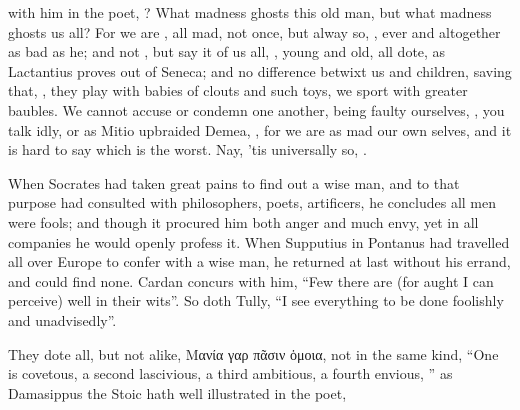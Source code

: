 with him in the poet, ? What madness ghosts this old man, but what madness
ghosts us all? For we are , all mad,  not once, but alway so, , ever and
altogether as bad as he; and not , but say it
of us all, , young and old, all dote, as Lactantius proves out
of Seneca; and no difference betwixt us and children, saving that, , they play with babies of clouts and such toys,
we sport with greater baubles. We cannot accuse or condemn one another, being
faulty ourselves, , you talk idly, or as
Mitio upbraided Demea, , for we are as
mad our own selves, and it is hard to say which is the worst. Nay, 'tis
universally so, .

When Socrates had taken great pains to find out a wise man,
and to that purpose had consulted with philosophers, poets, artificers, he
concludes all men were fools; and though it procured him both anger and much
envy, yet in all companies he would openly profess it. When
Supputius in Pontanus had travelled all over Europe to
confer with a wise man, he returned at last without his errand, and could find
none. Cardan concurs with him, \enquote{Few there are (for aught I
can perceive) well in their wits}. So doth Tully, \enquote{I see
everything to be done foolishly and unadvisedly}.


They dote all, but not alike, \textgreek{Μανία γαρ πᾶσιν
ὁμοια}, not in the same kind, \enquote{One is covetous, a second lascivious, a third
ambitious, a fourth envious, \etc{}} as Damasippus the Stoic hath well
illustrated in the poet,


